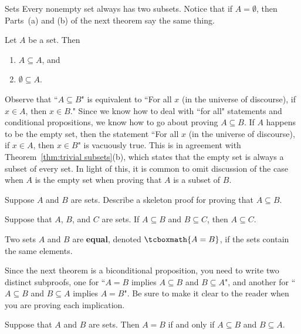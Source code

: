 \begin{section}{Sets}
Every nonempty set always has two subsets.  Notice that if $A=\emptyset$, then Parts~(a) and (b) of the next theorem say the same thing.

\begin{theorem}\label{thm:trivial subsets}
Let $A$ be a set.  Then
\begin{enumerate}[label=\textrm{(\alph*)}]
\item $A\subseteq A$, and
\item $\emptyset \subseteq A$.
\end{enumerate}
\end{theorem}

Observe that ``$A\subseteq B$" is equivalent to ``For all $x$ (in the universe of discourse), if $x\in A$, then $x\in B$."  Since we know how to deal with ``for all" statements and conditional propositions, we know how to go about proving $A\subseteq B$. If $A$ happens to be the empty set, then the statement ``For all $x$ (in the universe of discourse), if $x\in A$, then $x\in B$" is vacuously true.  This is in agreement with Theorem~\ref{thm:trivial subsets}(b), which states that the empty set is always a subset of every set.  In light of this, it is common to omit discussion of the case when $A$ is the empty set when proving that $A$ is a subset of $B$.

\begin{problem}
Suppose $A$ and $B$ are sets.  Describe a skeleton proof for proving that $A\subseteq B$.
\end{problem}

\begin{theorem}
Suppose that $A$, $B$, and $C$ are sets.  If $A\subseteq B$ and $B\subseteq C$, then $A\subseteq C$.
\end{theorem}

\begin{definition}
Two sets $A$ and $B$ are \textbf{equal}, denoted $\tcboxmath{A=B}$, if the sets contain the same elements.
\end{definition}

Since the next theorem is a biconditional proposition, you need to write two distinct subproofs, one for ``$A=B$ implies $A \subseteq B$ and $B \subseteq A$", and another for ``$A \subseteq B$ and $B \subseteq A$ implies $A=B$". Be sure to make it clear to the reader when you are proving each implication.

\begin{theorem}
Suppose that $A$ and $B$ are sets. Then $A=B$ if and only if $A \subseteq B$ and $B \subseteq A$.
\end{theorem}


\end{section}
